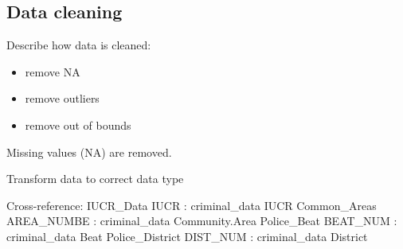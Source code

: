 \subsection{Data cleaning}\label{subsection}

Describe how data is cleaned:
\begin{itemize}
    \item remove NA
    \item remove outliers
    \item remove out of bounds
\end{itemize}

Missing values (NA) are removed.

Transform data to correct data type

Cross-reference:
IUCR_Data IUCR  : criminal_data IUCR
Common_Areas AREA_NUMBE : criminal_data Community.Area
Police_Beat BEAT_NUM : criminal_data Beat
Police_District DIST_NUM : criminal_data District